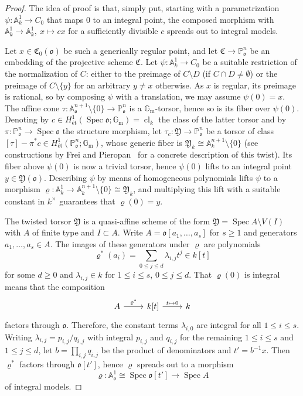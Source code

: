 \documentclass[a4paper, twoside, 11pt]{amsart}
\theoremstyle{definition}
\newcommand{\mC}{\mathfrak{C}}
\newcommand{\mY}{\mathfrak{Y}}
\newcommand{\fo}{\mathfrak{o}}
\newcommand{\dA}{\mathbb{A}}
\newcommand{\PP}{\mathbb{P}}
\newcommand{\Gm}{\mathbb{G}_\mathrm{m}}
\DeclareMathOperator{\cl}{cl}
\DeclareMathOperator{\Spec}{Spec}
\newcommand{\et}{\textrm{ét}}
\begin{document}
\begin{proof}
The idea of proof is that, simply put, starting with a parametrization $\psi\colon \dA_k^1\to C_0$ that maps $0$ to an integral point, the composed morphism with $\dA_k^1 \to \dA_k^1,\ x\mapsto cx$ for a sufficiently divisible $c$ spreads out to integral models.

	Let $x\in \mC_0(\fo)$ be such a generically regular point, and let $\mC \to \PP^n_{\fo}$ be an embedding of the projective scheme $\mC$. 
	Let $\psi\colon \dA_k^1\to C_0$ be a suitable restriction of the normalization of $C$: either to the preimage of $C\setminus D$ (if $C\cap D\ne\emptyset$) or the preimage of $C\setminus \{y\}$ for an arbitrary $y\ne x$ otherwise.
	As $x$ is regular, its preimage is rational, so by composing $\psi$ with a translation, we may assume $\psi(0)=x$.
	The affine cone $\tau\colon \dA_{\fo}^{n+1}\setminus \{0\} \to \PP^n_{\fo}$ is a $\Gm$-torsor, hence so is its fiber over $\psi(0)$.
	Denoting by $c \in H^1_\et(\Spec \fo;\Gm)=\cl_k$ the class of the latter torsor and by $\pi\colon \PP^n_\fo \to \Spec \fo$ the structure morphism, let $\tau_c\colon \mY\to \PP^n_{\fo}$ be a torsor of class $[\tau]-\pi^*c\in H_\et^1(\PP_\fo^n;\Gm)$, whose generic fiber is $\mY_k \cong \dA^{n+1}_k \setminus \{0\}$ (see constructions by Frei and Pieropan~\cite[Def~2.4, Prop~2.5, Thm.~2.7]{FP} for a concrete description of this twist). Its fiber above $\psi(0)$ is now a trivial torsor, hence $\psi(0)$ lifts to an integral point $y\in \mY(\fo)$.
	Describing $\psi$ by means of homogeneous polynomials lifts $\psi$ to a morphism $\varrho\colon \dA^1_k \to \dA_k^{n+1}\setminus \{0\} \cong \mY_k$, and multiplying this lift with a suitable constant in $k^\times$ guarantees that $\varrho(0)=y$.

	The twisted torsor $\mY$ is a quasi-affine scheme of the form $\mY = \Spec A\setminus V(I)$ with $A$ of finite type and $I\subset A$. Write  $A = \fo[a_1,\dots,a_s]$ for $s\ge 1$ and generators $a_1,\dots, a_s\in A$. The images of these generators under $\varrho$ are polynomials
	\begin{equation*}
		\varrho^*(a_i) = \sum_{0\le j\le d} \lambda_{i,j}t^j \in k[t]
	\end{equation*}
	for some $d\ge 0$ and $\lambda_{i,j}\in k$ for $1\le i \le s$, $0\le j\le d$.
	That $\varrho(0)$ is integral means that the composition
	\begin{equation*}
		\begin{tikzcd}
			A \arrow[r, "\varrho^*"] & k[t] \arrow[r, "t\mapsto 0"] & k
		\end{tikzcd}
	\end{equation*}
	factors through $\fo$. Therefore, the constant terms $\lambda_{i,0}$ are integral for all $1\le i \le s$.
	Writing $\lambda_{i,j} = p_{i,j}/q_{i,j}$ with integral $p_{i,j}$ and $q_{i,j}$ for the remaining $1\le i \le s$ and $1\le j\le d$, let $b = \prod_{i,j}q_{i,j}$ be the product of denominators and $t' = b^{-1}x$. Then $\varrho^*$ factors through $\fo[t']$, hence $\varrho$ spreads out to a morphism
	\begin{equation*}
	\varrho\colon \dA_{\fo}^1 \cong \Spec \fo[t'] \to \Spec A
	\end{equation*}
	of integral models.
	

\end{proof}
\end{document}
